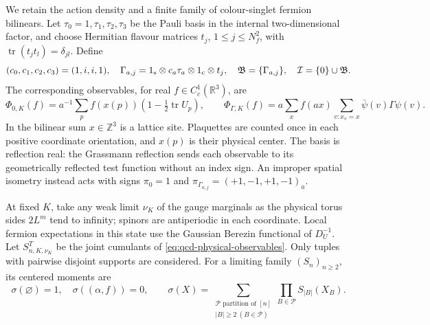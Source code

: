 \documentclass[11pt,letterpaper,reqno]{amsart}
\theoremstyle{definition}
\theoremstyle{remark}
\begin{document}
We retain the action density and a finite family of colour-singlet
fermion bilinears. Let $\tau_0=1,\tau_1,\tau_2,\tau_3$
be the Pauli basis in the internal two-dimensional factor,
and choose Hermitian flavour matrices $t_j$, $1\le j\le N_f^2$,
with $\operatorname{tr}(t_jt_l)=\delta_{jl}$. Define
\[
 (c_0,c_1,c_2,c_3)=(1,i,i,1),\quad
 \Gamma_{a,j}=1_{\rm s}\otimes c_a\tau_a\otimes1_{\rm c}\otimes t_j,
 \quad \mathfrak B=\{\Gamma_{a,j}\},\quad
 \mathcal I=\{0\}\cup\mathfrak B.
\]
The corresponding observables, for real $f\in C_c^1(\mathbb R^3)$, are
\begin{equation}\label{eq:qcd-physical-observables}
 \Phi_{0,K}(f)=a^{-1}\sum_p f(x(p))
                (1-\tfrac12\operatorname{tr}U_p),\qquad
 \Phi_{\Gamma,K}(f)=a\sum_x f(ax)
                      \sum_{v:x_v=x}\bar\psi(v)\Gamma\psi(v).
\end{equation}
In the bilinear sum $x\in\mathbb Z^3$ is a lattice site.
Plaquettes are counted once in each positive coordinate orientation,
and $x(p)$ is their physical center. The basis is reflection real:
the Grassmann reflection sends each observable to its geometrically
reflected test function without an index sign. An improper spatial
isometry instead acts with signs
$\pi_0=1$ and $\pi_{\Gamma_{a,j}}=(+1,-1,+1,-1)_a$.

At fixed $K$, take any weak limit $\nu_K$ of the gauge marginals
as the physical torus sides $2L^m$ tend to infinity; spinors are
antiperiodic in each coordinate. Local fermion expectations in this
state use the Gaussian Berezin functional of $D_U^{-1}$.
Let $S^T_{n,K,\nu_K}$ be the joint cumulants of
\eqref{eq:qcd-physical-observables}. Only tuples with pairwise
disjoint supports are considered. For a limiting family $(S_n)_{n\ge2}$,
its centered moments are
\begin{equation}\label{eq:qcd-centered-moments}
 \sigma(\varnothing)=1,\quad\sigma((\alpha,f))=0,\qquad
 \sigma(X)=\sum_{\substack{\mathcal P\text{ partition of }[n]\\
                       |B|\ge2\ (B\in\mathcal P)}}
                                \prod_{B\in\mathcal P}S_{|B|}(X_B).
\end{equation}
\end{document}
